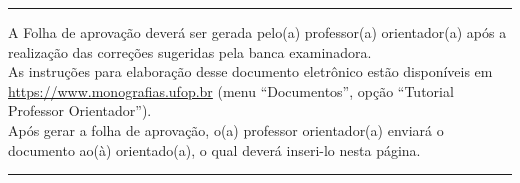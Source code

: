 

%
% 
%

\vspace*{10cm}
\hrule              %
\begin{center}          %
\begin{minipage}[c]{12.5cm}   %
    A Folha de aprovação deverá ser gerada pelo(a) professor(a) orientador(a) após a realização das correções sugeridas pela banca examinadora. \\
        
    As instruções para elaboração desse documento eletrônico estão disponíveis em \url{https://www.monografias.ufop.br} (menu ``Documentos'', opção ``Tutorial Professor Orientador''). \\
        
    Após gerar a folha de aprovação, o(a) professor orientador(a) enviará o documento ao(à) orientado(a), o qual deverá inseri-lo nesta página.    
\end{minipage}
\end{center}
\hrule

